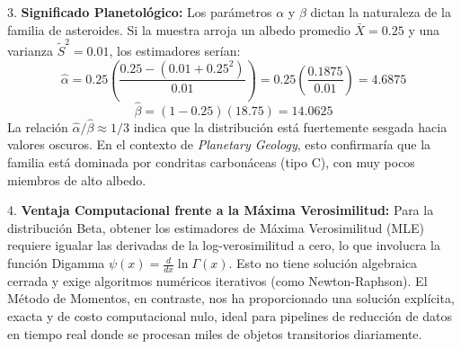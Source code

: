 3. \textbf{Significado Planetológico:}
Los parámetros $\alpha$ y $\beta$ dictan la naturaleza de la familia de asteroides. 
Si la muestra arroja un albedo promedio $\bar{X} = 0.25$ y una varianza $\tilde{S}^2 = 0.01$, los estimadores serían:
$$ \hat{\alpha} = 0.25 \left( \frac{0.25 - (0.01 + 0.25^2)}{0.01} \right) = 0.25 \left( \frac{0.1875}{0.01} \right) = 4.6875 $$
$$ \hat{\beta} = (1 - 0.25) (18.75) = 14.0625 $$
La relación $\hat{\alpha} / \hat{\beta} \approx 1/3$ indica que la distribución está fuertemente sesgada hacia valores oscuros. En el contexto de \textit{Planetary Geology}, esto confirmaría que la familia está dominada por condritas carbonáceas (tipo C), con muy pocos miembros de alto albedo. 

4. \textbf{Ventaja Computacional frente a la Máxima Verosimilitud:}
Para la distribución Beta, obtener los estimadores de Máxima Verosimilitud (MLE) requiere igualar las derivadas de la log-verosimilitud a cero, lo que involucra la función Digamma $\psi(x) = \frac{d}{dx} \ln \Gamma(x)$. Esto no tiene solución algebraica cerrada y exige algoritmos numéricos iterativos (como Newton-Raphson). El Método de Momentos, en contraste, nos ha proporcionado una solución explícita, exacta y de costo computacional nulo, ideal para pipelines de reducción de datos en tiempo real donde se procesan miles de objetos transitorios diariamente.